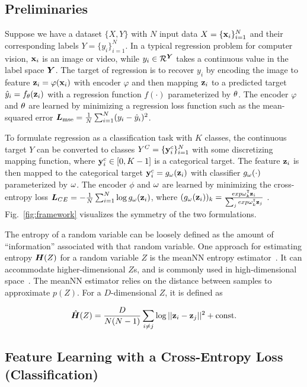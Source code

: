 \documentclass{article} %
\begin{document}
\subsection{Preliminaries}
Suppose we have a dataset $\{X, Y\}$ with $N$ input data $X=\{{\bf x}_i\}_{i=1}^N$ and their corresponding labels $Y=\{y_i\}_{i=1}^N$. In a typical regression problem for computer vision, ${\bf x}_i$ 
is an image or video,  
while $y_i \in \mathcal{R}^{{\bm{Y}}}$ takes a continuous value in the label space ${\bm{Y}}$.
The target of regression is to recover $y_i$ by encoding the image to feature ${\bf z}_i=\varphi({\bf x}_i)$ with encoder $\varphi$ and then mapping ${\bf z}_i$ to a predicted target $\hat{y}_i = f_{{\theta}}({\bf z}_i)$ with a regression function $f(\cdot)$ parameterized by ${\theta}$. 
The encoder $\varphi$ and ${\theta}$ are learned by minimizing a regression loss function such as the mean-squared error ${\bm{L}}_{\text{mse}} = \frac{1}{N}\sum_{i=1}^N(y_i-\hat{y}_i)^2$. 

To formulate regression as a classification task with $K$ classes, the continuous target $Y$ can be converted to classes $Y^C=\{{\bf y}^c_i\}_{i=1}^N$ with some discretizing mapping function, where ${\bf y}^c_i \in [0, K-1]$ is a categorical target. The feature ${\bf z}_i$ is then mapped to the categorical target ${\bf y}^c_i = g_{{\omega}}({\bf z}_i)$ with classifier $g_{{\omega}}(\cdot)$ parameterized by ${\omega}$.  The encoder $\phi$ and ${\omega}$ are learned by minimizing the cross-entropy loss ${\bm{L}}_{CE} = -\frac{1}{N}\sum_{i=1}^{N}\log g_{{\omega}}({\bf z}_i)$, where  $(g_{{\omega}}({\bf z}_i))_k=\frac{exp {\omega}_k^{{\sf T}}{\bf z}_i}{\sum_j exp {\omega}_k^{{\sf T}}{\bf z}_j}$ .
Fig.~\ref{fig:framework} visualizes the symmetry of the two formulations. 

The entropy of a random variable can be loosely defined as the amount of ``information'' associated with that random variable. One approach for estimating entropy ${\bm{H}}(Z)$ for a random variable $Z$ is the meanNN entropy estimator~\citep{faivishevsky2008ica}.  
It can accommodate higher-dimensional $Z$s, and is commonly used in high-dimensional space~\citep{faivishevsky2010nonparametric}. 
The meanNN estimator relies on the distance between samples to approximate $p(Z)$. For a $D$-dimensional $Z$, it is defined as

\begin{equation}
    \hat{{\bm{H}}}(Z) = \frac{D}{N(N-1)}\sum_{i \neq j} \log ||{\bf z}_i - {\bf z}_j||^2 + \text{const}.
    \label{equ_entropyestimation}
\end{equation}


\subsection{Feature Learning with a Cross-Entropy Loss (Classification)} 
\end{document}
